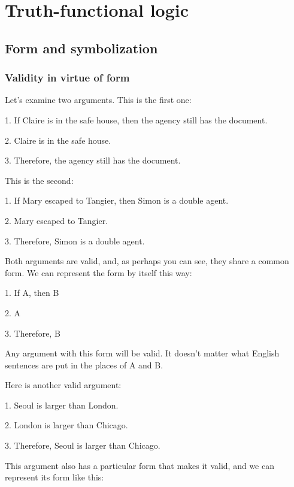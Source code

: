 \part{Truth-functional logic}
\label{ch.TFL}

\chapter{Form and symbolization}\label{symbolization}

\section{Validity in virtue of form}\label{s:ValidityInVirtueOfForm}
Let's examine two arguments. This is the first one:
	\begin{earg}
		\item[1.] If Claire is in the safe house, then the agency still has the document.
		\item[2.] Claire is in the safe house.
		\item[3.] Therefore, the agency still has the document.
	\end{earg}
This is the second:
	\begin{earg}
		\item[1.] If Mary escaped to Tangier, then Simon is a double agent.
		\item[2.] Mary escaped to Tangier.
		\item[3.] Therefore, Simon is a double agent.
	\end{earg}
Both arguments are valid, and, as perhaps you  can see, they share a common form. We can represent the form by itself this way:
	\begin{earg}
		\item[1.] If A, then B
		\item[2.] A
		\item[3.] Therefore, B
	\end{earg}
Any argument with this form will be valid. It doesn't matter what English sentences are put in the places of A and B. 

Here is another valid argument:
	\begin{earg}
		\item[1.] Seoul is larger than London.
		\item[2.] London is larger than Chicago.
		\item[3.] Therefore, Seoul is larger than Chicago. 
	\end{earg}
This argument also has a particular form that makes it valid, and we can represent its form like this:
\bigskip

